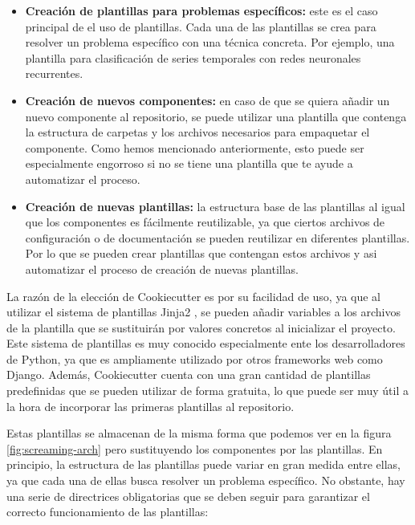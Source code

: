 \begin{itemize}
    \item \textbf{Creación de plantillas para problemas específicos:} este es el caso
    principal de el uso de plantillas. Cada una de las plantillas se crea para resolver
    un problema específico con una técnica concreta. Por ejemplo, una plantilla para
    clasificación de series temporales con redes neuronales recurrentes.
    \item \textbf{Creación de nuevos componentes:} en caso de que se quiera añadir
    un nuevo componente al repositorio, se puede utilizar una plantilla que contenga
    la estructura de carpetas y los archivos necesarios para empaquetar el componente.
    Como hemos mencionado anteriormente, esto puede ser especialmente engorroso si no
    se tiene una plantilla que te ayude a automatizar el proceso.
    \item \textbf{Creación de nuevas plantillas:} la estructura base de las plantillas
    al igual que los componentes es fácilmente reutilizable, ya que ciertos archivos de
    configuración o de documentación se pueden reutilizar en diferentes plantillas. Por
    lo que se pueden crear plantillas que contengan estos archivos y asi automatizar el
    proceso de creación de nuevas plantillas. 
\end{itemize}

La razón de la elección de Cookiecutter es por su facilidad de uso, ya que
al utilizar el sistema de plantillas Jinja2 \cite{Jinja}, se pueden añadir variables a los
archivos de la plantilla que se sustituirán por valores concretos al inicializar
el proyecto. Este sistema de plantillas es muy conocido especialmente ente los
desarrolladores de Python, ya que es ampliamente utilizado por otros frameworks
web como Django. Además, Cookiecutter cuenta con una gran cantidad de plantillas
predefinidas que se pueden utilizar de forma gratuita, lo que puede ser muy útil
a la hora de incorporar las primeras plantillas al repositorio.\medskip

Estas plantillas se almacenan de la misma forma que podemos ver en la figura
\ref{fig:screaming-arch} pero sustituyendo los componentes por las plantillas.
En principio, la estructura de las plantillas puede variar en gran medida entre
ellas, ya que cada una de ellas busca resolver un problema específico. No obstante,
hay una serie de directrices obligatorias que se deben seguir para garantizar el
correcto funcionamiento de las plantillas:

